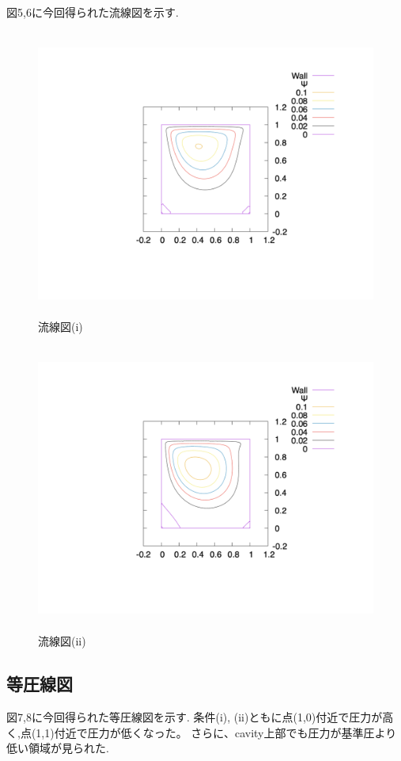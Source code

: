 \documentclass[upLaTeX,a4paper]{jsarticle}
\begin{document}
図5,6に今回得られた流線図を示す.

\begin{figure}[H]
  \centering
  \includegraphics[height=9.5cm, clip, trim=0 200 0 0]{outputs/img/stream_line_re50.png}
  \caption{流線図(i)}
  \label{fig:velocity_vector_re50}
\end{figure}
\begin{figure}[H]
  \centering
  \includegraphics[height=9.5cm, clip, trim=0 200 0 0]{outputs/img/stream_line_re200.png}
  \caption{流線図(ii)}
  \label{fig:velocity_vector_re200}
\end{figure}


\subsection{等圧線図}
図7,8に今回得られた等圧線図を示す.
条件(i), (ii)ともに点(1,0)付近で圧力が高く,点(1,1)付近で圧力が低くなった。
さらに、cavity上部でも圧力が基準圧より低い領域が見られた.
\end{document}
